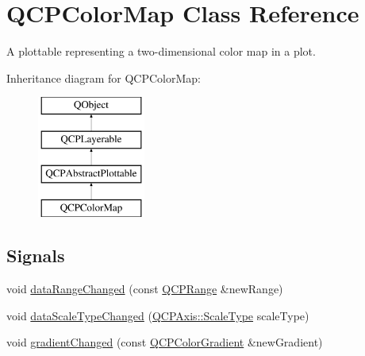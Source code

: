 \hypertarget{class_q_c_p_color_map}{}\section{Q\+C\+P\+Color\+Map Class Reference}
\label{class_q_c_p_color_map}


A plottable representing a two-\/dimensional color map in a plot.  


Inheritance diagram for Q\+C\+P\+Color\+Map\+:\begin{figure}[H]
\begin{center}
\leavevmode
\includegraphics[height=4.000000cm]{class_q_c_p_color_map}
\end{center}
\end{figure}
\subsection*{Signals}
\begin{DoxyCompactItemize}
\item 
void \mbox{\hyperlink{class_q_c_p_color_map_a83ae5be3903da493f732e1a5c14fd807}{data\+Range\+Changed}} (const \mbox{\hyperlink{class_q_c_p_range}{Q\+C\+P\+Range}} \&new\+Range)
\item 
void \mbox{\hyperlink{class_q_c_p_color_map_a978d5d5c9f68cffef8c902b855c04490}{data\+Scale\+Type\+Changed}} (\mbox{\hyperlink{class_q_c_p_axis_a36d8e8658dbaa179bf2aeb973db2d6f0}{Q\+C\+P\+Axis\+::\+Scale\+Type}} scale\+Type)
\item 
void \mbox{\hyperlink{class_q_c_p_color_map_a31a12726736b1ac274e7b1d8dfb67468}{gradient\+Changed}} (const \mbox{\hyperlink{class_q_c_p_color_gradient}{Q\+C\+P\+Color\+Gradient}} \&new\+Gradient)
\end{DoxyCompactItemize}

